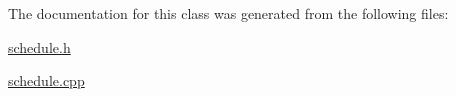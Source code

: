 The documentation for this class was generated from the following files\-:\begin{DoxyCompactItemize}
\item 
\hyperlink{schedule_8h}{schedule.\-h}\item 
\hyperlink{schedule_8cpp}{schedule.\-cpp}\end{DoxyCompactItemize}
